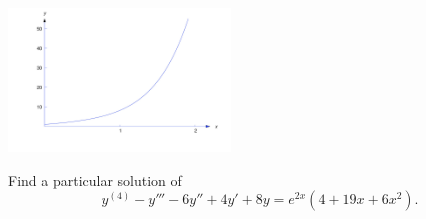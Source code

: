 \documentclass{ximera}
\begin{document}
\begin{example}
\begin{explanation}
\begin{image}
 \includegraphics[height=1.5in]{fig090301.jpg} 
\end{image}

\end{explanation}
\end{example}

\begin{example}\label{example:9.3.2}
Find a particular solution of
\begin{equation} \label{eq:9.3.4}
y^{(4)}-y'''-6y''+4y'+8y=e^{2x}(4+19x+6x^2).
\end{equation}


\end{example}
\end{document}
